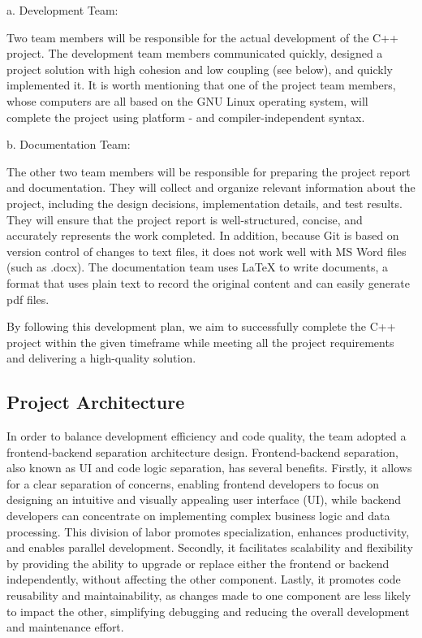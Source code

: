 {\begin{enumerate}
  a. Development Team:

  Two team members will be responsible for the actual development of the
  C++ project. The development team members communicated quickly,
  designed a project solution with high cohesion and low coupling (see
  below), and quickly implemented it. It is worth mentioning that one of
  the project team members, whose computers are all based on the GNU
  Linux operating system, will complete the project using platform - and
  compiler-independent syntax.

  b. Documentation Team:

  The other two team members will be responsible for preparing the
  project report and documentation. They will collect and organize
  relevant information about the project, including the design
  decisions, implementation details, and test results. They will ensure
  that the project report is well-structured, concise, and accurately
  represents the work completed. In addition, because Git is based on
  version control of changes to text files, it does not work well with
  MS Word files (such as .docx). The documentation team uses \LaTeX
  to write documents, a format that uses plain text to record the
  original content and can easily generate pdf files.
\end{enumerate}

By following this development plan, we aim to successfully complete the
C++ project within the given timeframe while meeting all the project
requirements and delivering a high-quality solution.

\hypertarget{project-architecture}{%
\subsection{Project Architecture}\label{project-architecture}}

In order to balance development efficiency and code quality, the team
adopted a frontend-backend separation architecture design.
Frontend-backend separation, also known as UI and code logic separation,
has several benefits. Firstly, it allows for a clear separation of
concerns, enabling frontend developers to focus on designing an
intuitive and visually appealing user interface (UI), while backend
developers can concentrate on implementing complex business logic and
data processing. This division of labor promotes specialization,
enhances productivity, and enables parallel development. Secondly, it
facilitates scalability and flexibility by providing the ability to
upgrade or replace either the frontend or backend independently, without
affecting the other component. Lastly, it promotes code reusability and
maintainability, as changes made to one component are less likely to
impact the other, simplifying debugging and reducing the overall
development and maintenance effort.

}
